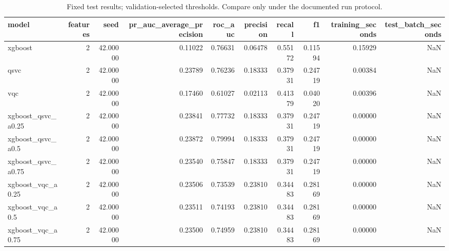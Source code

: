 \begin{table}
\caption{Fixed test results; validation-selected thresholds. Compare only under the documented run protocol.}
\begin{tabular}{lrrrrrrrrr}
\toprule
model & features & seed & pr\_auc\_average\_precision & roc\_auc & precision & recall & f1 & training\_seconds & test\_batch\_seconds \\
\midrule
xgboost & 2 & 42.00000 & 0.11022 & 0.76631 & 0.06478 & 0.55172 & 0.11594 & 0.15929 & NaN \\
qsvc & 2 & 42.00000 & 0.23789 & 0.76236 & 0.18333 & 0.37931 & 0.24719 & 0.00384 & NaN \\
vqc & 2 & 42.00000 & 0.17460 & 0.61027 & 0.02113 & 0.41379 & 0.04020 & 0.00396 & NaN \\
xgboost\_qsvc\_a0.25 & 2 & 42.00000 & 0.23841 & 0.77732 & 0.18333 & 0.37931 & 0.24719 & 0.00000 & NaN \\
xgboost\_qsvc\_a0.5 & 2 & 42.00000 & 0.23872 & 0.79994 & 0.18333 & 0.37931 & 0.24719 & 0.00000 & NaN \\
xgboost\_qsvc\_a0.75 & 2 & 42.00000 & 0.23540 & 0.75847 & 0.18333 & 0.37931 & 0.24719 & 0.00000 & NaN \\
xgboost\_vqc\_a0.25 & 2 & 42.00000 & 0.23506 & 0.73539 & 0.23810 & 0.34483 & 0.28169 & 0.00000 & NaN \\
xgboost\_vqc\_a0.5 & 2 & 42.00000 & 0.23511 & 0.74193 & 0.23810 & 0.34483 & 0.28169 & 0.00000 & NaN \\
xgboost\_vqc\_a0.75 & 2 & 42.00000 & 0.23500 & 0.74959 & 0.23810 & 0.34483 & 0.28169 & 0.00000 & NaN \\
\bottomrule
\end{tabular}
\end{table}
